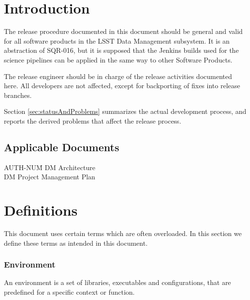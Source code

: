 \section{Introduction} \label{sec:intro}

The release procedure documented in this document should be general and valid for all software products in the LSST Data Management subsystem.
It is an abstraction of SQR-016, but it is supposed that the Jenkins builds used for the science pipelines can be applied in the same way to other Software Products.

The release engineer should be in charge of the release activities documented here. All developers are not affected, except for backporting of fixes into release branches.

Section \ref{sec:statusAndProblems} summarizes the actual development process, and reports the derived problems that affect the release process.


\subsection{Applicable Documents}

\begin{tabbing}
AUTH-NUM\= \kill
{} \>     DM Architecture\\
 \>     DM Project Management Plan   \\
\end{tabbing}


\newpage
\section{Definitions} \label{sec:definitions}

This document uses certain terms which are often overloaded. In this section we define these terms  as intended in this document.


\subsubsection{Environment} \label{sec:envdef}

An environment is a set of libraries, executables and configurations, that are predefined for a specific context or function.

